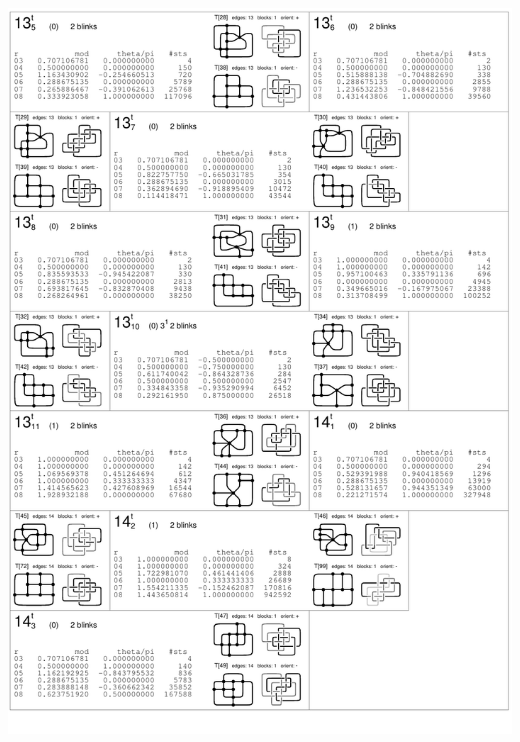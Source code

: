 \begin{center}
 \includegraphics[height=23.5cm]{E.figsbw2/con3catalog003_bw.pdf} \eject

\end{center}
